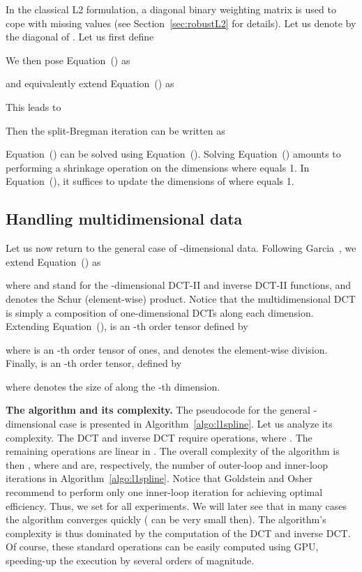 \documentclass[preprint]{imsart}
\begin{document}
In the classical L2 formulation, a diagonal binary weighting matrix  is used to cope with missing values (see Section~\ref{sec:robustL2} for details). Let us denote by  the diagonal of . Let us first define

We then pose Equation~() as

and equivalently extend Equation~() as

This leads to

Then the split-Bregman iteration can be written as

Equation~() can be solved using Equation~(). Solving Equation~() amounts to performing a shrinkage operation on the dimensions where  equals 1. In Equation~(), it suffices to update the dimensions of  where  equals 1.

\subsection{Handling multidimensional data}

Let us now return to the general case of -dimensional data. Following Garcia~\cite{garcia10}, we extend Equation~() as

where  and  stand for the -dimensional DCT-II and inverse DCT-II functions, and  denotes the Schur (element-wise) product. Notice that the multidimensional DCT is simply a composition of one-dimensional DCTs along each dimension. Extending Equation~(),  is  an -th order tensor defined by

where  is an -th order tensor of ones, and  denotes the element-wise division.
Finally,  is an -th order tensor, defined by

where  denotes the size of  along the -th dimension.

\medskip

\noindent\textbf{The algorithm and its complexity.}
The pseudocode for the general -dimensional case is presented in Algorithm~\ref{algo:l1spline}. Let us analyze its complexity.
The DCT and inverse DCT require  operations, where . The remaining operations are linear in . The overall complexity of the algorithm is then , where  and  are, respectively, the number of outer-loop and inner-loop iterations in Algorithm~\ref{algo:l1spline}. Notice that Goldstein and Osher~\cite{goldstein09} recommend to perform only one inner-loop iteration for achieving optimal efficiency. Thus, we set  for all experiments.
We will later see that in many cases the algorithm converges quickly ( can be very small then).
The algorithm's complexity is thus dominated by the computation of the DCT and inverse DCT. Of course, these standard operations can be easily computed using GPU, speeding-up the execution by several orders of magnitude.
\end{document}
